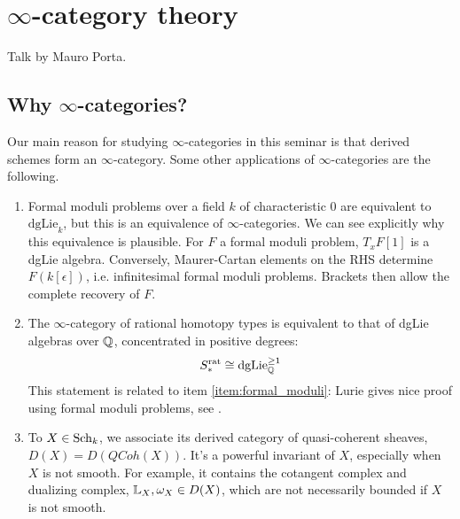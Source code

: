 \documentclass[10pt,a4paper,reqno,oneside]{book} %
\theoremstyle{plain}
\theoremstyle{definition}
\theoremstyle{remark}
\numberwithin{equation}{section}
\begin{document}
\chapter{$\infty$-category theory}
Talk by Mauro Porta.

\section{Why $\infty$-categories?}

Our main reason for studying $\infty$-categories in this seminar is that derived schemes form an $\infty$-category.
Some other applications of $\infty$-categories are the following.

\begin{enumerate}
\item \label{item:formal_moduli}
Formal moduli problems over a field $k$ of characteristic 0 are equivalent to $\text{dgLie}_{k}$, but this is
an equivalence of $\infty$-categories. We can see explicitly why this equivalence is plausible. For $F$ a formal moduli problem, 
$T_xF[1]$ is a dgLie algebra. Conversely, Maurer-Cartan elements on the RHS determine $F(k[\epsilon])$, 
i.e. infinitesimal formal moduli problems. Brackets then allow the complete recovery of $F$. 

\item 
The $\infty$-category of rational homotopy types is equivalent to that of dgLie algebras over $\mathbb Q$, concentrated in
positive degrees:
\[	S_*^{\text{rat}} \cong \text{dgLie}_{\mathbb Q}^{\geq 1}	\] 
This statement is related to item \ref{item:formal_moduli}: Lurie gives nice proof using formal moduli problems, see 
\cite{DAG-XIII}.

\item To $X \in \mathrm{Sch}_k$, we associate its derived category of quasi-coherent sheaves, $D(X) = D(QCoh(X))$. 
It's a powerful invariant of $X$, especially when $X$ is not
smooth. For example, it contains the cotangent complex and dualizing complex, $\mathbb L_X , \omega_X \in D(X)$, which are not 
necessarily bounded if $X$ is not smooth.


\end{enumerate}
\end{document}
